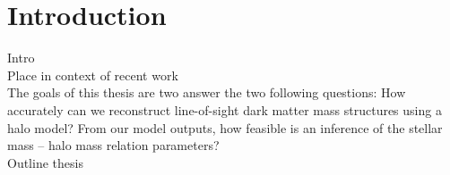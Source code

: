 \documentclass[%
 reprint,
 amsmath,amssymb,
 aps,nofootinbib
]{revtex4-1}
\begin{document}
\maketitle



\section{Introduction}

Intro\\

Place in context of recent work\\

The goals of this thesis are two answer the two following questions: How accurately can we reconstruct line-of-sight dark matter mass structures using a halo model? From our model outputs, how feasible is an inference of the stellar mass – halo mass relation parameters?\\

Outline thesis


\end{document}
